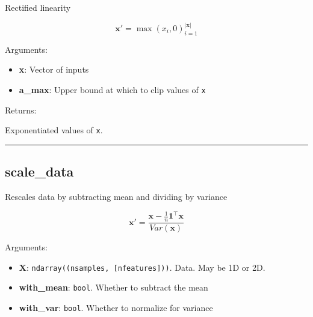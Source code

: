 \begin{Shaded}
\begin{Highlighting}[]
\OperatorTok{=}\NormalTok{)}
\end{Highlighting}
\end{Shaded}

Rectified linearity

\[
\mathbf x' = \max (x_i, 0)_{i=1}^{|\mathbf x|}
\]

Arguments:

\begin{itemize}
\tightlist
\item
  \textbf{x}: Vector of inputs
\item
  \textbf{a\_max}: Upper bound at which to clip values of \texttt{x}
\end{itemize}

Returns:

Exponentiated values of \texttt{x}.

\begin{center}\rule{0.5\linewidth}{\linethickness}\end{center}

\subsection{scale\_data}\label{scale_data}

\begin{Shaded}
\begin{Highlighting}[]
\OperatorTok{=}\OperatorTok{=}\OperatorTok{=}\NormalTok{)}
\end{Highlighting}
\end{Shaded}

Rescales data by subtracting mean and dividing by variance

\[
\mathbf x' = \frac{\mathbf x - \frac{1}{n} \mathbf 1^\top \mathbf x}{Var(\mathbf x)}
\]

Arguments:

\begin{itemize}
\tightlist
\item
  \textbf{X}: \texttt{ndarray((nsamples,\ {[}nfeatures{]}))}. Data. May
  be 1D or 2D.
\item
  \textbf{with\_mean}: \texttt{bool}. Whether to subtract the mean
\item
  \textbf{with\_var}: \texttt{bool}. Whether to normalize for variance
\end{itemize}


